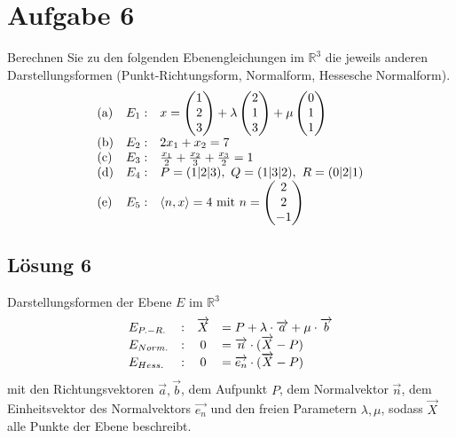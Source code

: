 \section{Aufgabe 6}

Berechnen Sie zu den folgenden Ebenengleichungen im $\displaystyle \mathbb{R}^{3}$ die jeweils anderen Darstellungsformen (Punkt-Richtungsform, Normalform, Hessesche Normalform).
\begin{equation*}
	\begin{array}{ l r l }
		\text{(a)} & E_{1} : & x=\begin{pmatrix}
			1\\
			2\\
			3
		\end{pmatrix} +\lambda \begin{pmatrix}
			2\\
			1\\
			3
		\end{pmatrix} +\mu \begin{pmatrix}
			0\\
			1\\
			1
		\end{pmatrix}\\
		\text{(b)} & E_{2} : & 2x_{1} +x_{2} =7\\
		\text{(c)} & E_{3} : & \frac{x_{1}}{2} +\frac{x_{2}}{3} +\frac{x_{3}}{2} =1\\
		\text{(d)} & E_{4} : & P=( 1|2|3) ,\ Q=( 1|3|2) ,\ R=( 0|2|1)\\
		\text{(e)} & E_{5} : & \langle n,x\rangle =4\ \text{mit} \ n=\begin{pmatrix}
			2\\
			2\\
			-1
		\end{pmatrix}
	\end{array}
\end{equation*}

\subsection{Lösung 6}

Darstellungsformen der Ebene $\displaystyle E$ im $\displaystyle \mathbb{R}^{3}$
\begin{equation*}
	\begin{array}{ l l c l }
		E_{P.-R.} & : & \vec{X} & =P+\lambda \cdotp \vec{a} +\mu \cdotp \vec{b}\\
		E_{Norm.} & : & 0 & =\vec{n} \cdotp (\vec{X} -P)\\
		E_{Hess.} & : & 0 & =\overrightarrow{e_{n}} \cdotp (\vec{X} -P)
	\end{array}
\end{equation*}
mit den Richtungsvektoren $\displaystyle \vec{a} ,\vec{b}$, dem Aufpunkt $\displaystyle P$, dem Normalvektor $\displaystyle \vec{n}$, dem Einheitsvektor des Normalvektors $\displaystyle \overrightarrow{e_{n}}$ und den freien Parametern $\displaystyle \lambda ,\mu $, sodass $\displaystyle \vec{X}$ alle Punkte der Ebene beschreibt.


